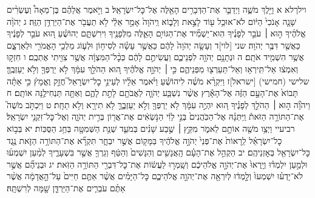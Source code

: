 \documentclass[twoside, openany, parskip=half, 11pt]{book}
\begin{document}
וילךלא א וַיֵּ֖לֶךְ מֹשֶׁ֑ה וַיְדַבֵּ֛ר אֶת־הַדְּבָרִ֥ים הָאֵ֖לֶּה אֶל־כׇּל־יִשְׂרָאֵֽל׃ ב וַיֹּ֣אמֶר אֲלֵהֶ֗ם בֶּן־מֵאָה֩ וְעֶשְׂרִ֨ים שָׁנָ֤ה אָנֹכִי֙ הַיּ֔וֹם לֹא־אוּכַ֥ל ע֖וֹד לָצֵ֣את וְלָב֑וֹא וַֽיהֹוָה֙ אָמַ֣ר אֵלַ֔י לֹ֥א תַעֲבֹ֖ר אֶת־הַיַּרְדֵּ֥ן הַזֶּֽה׃ ג יְהֹוָ֨ה אֱלֹהֶ֜יךָ ה֣וּא ׀ עֹבֵ֣ר לְפָנֶ֗יךָ הֽוּא־יַשְׁמִ֞יד אֶת־הַגּוֹיִ֥ם הָאֵ֛לֶּה מִלְּפָנֶ֖יךָ וִירִשְׁתָּ֑ם יְהוֹשֻׁ֗עַ ה֚וּא עֹבֵ֣ר לְפָנֶ֔יךָ כַּאֲשֶׁ֖ר דִּבֶּ֥ר יְהֹוָה׃ שני [לוי]ד וְעָשָׂ֤ה יְהֹוָה֙ לָהֶ֔ם כַּאֲשֶׁ֣ר עָשָׂ֗ה לְסִיח֥וֹן וּלְע֛וֹג מַלְכֵ֥י הָאֱמֹרִ֖י וּלְאַרְצָ֑ם אֲשֶׁ֥ר הִשְׁמִ֖יד אֹתָֽם׃ ה וּנְתָנָ֥ם יְהֹוָ֖ה לִפְנֵיכֶ֑ם וַעֲשִׂיתֶ֣ם לָהֶ֔ם כְּכׇ֨ל־הַמִּצְוָ֔ה אֲשֶׁ֥ר צִוִּ֖יתִי אֶתְכֶֽם׃ ו חִזְק֣וּ וְאִמְצ֔וּ אַל־תִּֽירְא֥וּ וְאַל־תַּעַרְצ֖וּ מִפְּנֵיהֶ֑ם כִּ֣י ׀ יְהֹוָ֣ה אֱלֹהֶ֗יךָ ה֚וּא הַהֹלֵ֣ךְ עִמָּ֔ךְ לֹ֥א יַרְפְּךָ֖ וְלֹ֥א יַעַזְבֶֽךָּ׃
שלישי (חמישי) [ישראל]ז וַיִּקְרָ֨א מֹשֶׁ֜ה לִיהוֹשֻׁ֗עַ וַיֹּ֨אמֶר אֵלָ֜יו לְעֵינֵ֣י כׇל־יִשְׂרָאֵל֮ חֲזַ֣ק וֶאֱמָץ֒ כִּ֣י אַתָּ֗ה תָּבוֹא֙ אֶת־הָעָ֣ם הַזֶּ֔ה אֶל־הָאָ֕רֶץ אֲשֶׁ֨ר נִשְׁבַּ֧ע יְהֹוָ֛ה לַאֲבֹתָ֖ם לָתֵ֣ת לָהֶ֑ם וְאַתָּ֖ה תַּנְחִילֶ֥נָּה אוֹתָֽם׃ ח וַיהֹוָ֞ה ה֣וּא ׀ הַהֹלֵ֣ךְ לְפָנֶ֗יךָ ה֚וּא יִהְיֶ֣ה עִמָּ֔ךְ לֹ֥א יַרְפְּךָ֖ וְלֹ֣א יַעַזְבֶ֑ךָּ לֹ֥א תִירָ֖א וְלֹ֥א תֵחָֽת׃ ט וַיִּכְתֹּ֣ב מֹשֶׁה֮ אֶת־הַתּוֹרָ֣ה הַזֹּאת֒ וַֽיִּתְּנָ֗הּ אֶל־הַכֹּֽהֲנִים֙ בְּנֵ֣י לֵוִ֔י הַנֹּ֣שְׂאִ֔ים אֶת־אֲר֖וֹן בְּרִ֣ית יְהֹוָ֑ה וְאֶל־כׇּל־זִקְנֵ֖י יִשְׂרָאֵֽל׃ רביעיי וַיְצַ֥ו מֹשֶׁ֖ה אוֹתָ֣ם לֵאמֹ֑ר מִקֵּ֣ץ ׀ שֶׁ֣בַע שָׁנִ֗ים בְּמֹעֵ֛ד שְׁנַ֥ת הַשְּׁמִטָּ֖ה בְּחַ֥ג הַסֻּכּֽוֹת׃ יא בְּב֣וֹא כׇל־יִשְׂרָאֵ֗ל לֵֽרָאוֹת֙ אֶת־פְּנֵי֙ יְהֹוָ֣ה אֱלֹהֶ֔יךָ בַּמָּק֖וֹם אֲשֶׁ֣ר יִבְחָ֑ר תִּקְרָ֞א אֶת־הַתּוֹרָ֥ה הַזֹּ֛את נֶ֥גֶד כׇּל־יִשְׂרָאֵ֖ל בְּאׇזְנֵיהֶֽם׃ יב הַקְהֵ֣ל אֶת־הָעָ֗ם הָֽאֲנָשִׁ֤ים וְהַנָּשִׁים֙ וְהַטַּ֔ף וְגֵרְךָ֖ אֲשֶׁ֣ר בִּשְׁעָרֶ֑יךָ לְמַ֨עַן יִשְׁמְע֜וּ וּלְמַ֣עַן יִלְמְד֗וּ וְיָֽרְאוּ֙ אֶת־יְהֹוָ֣ה אֱלֹהֵיכֶ֔ם וְשָֽׁמְר֣וּ לַעֲשׂ֔וֹת אֶת־כׇּל־דִּבְרֵ֖י הַתּוֹרָ֥ה הַזֹּֽאת׃ יג וּבְנֵיהֶ֞ם אֲשֶׁ֣ר לֹא־יָדְע֗וּ יִשְׁמְעוּ֙ וְלָ֣מְד֔וּ לְיִרְאָ֖ה אֶת־יְהֹוָ֣ה אֱלֹהֵיכֶ֑ם כׇּל־הַיָּמִ֗ים אֲשֶׁ֨ר אַתֶּ֤ם חַיִּים֙ עַל־הָ֣אֲדָמָ֔ה אֲשֶׁ֨ר אַתֶּ֜ם עֹבְרִ֧ים אֶת־הַיַּרְדֵּ֛ן שָׁ֖מָּה לְרִשְׁתָּֽהּ׃
\end{document}
